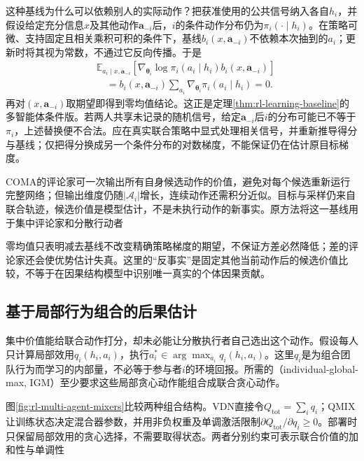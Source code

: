 这种基线为什么可以依赖别人的实际动作？把获准使用的公共信号纳入各自$h_i$，并假设给定充分信息$x$及其他动作$\bm a_{-i}$后，$i$的条件动作分布仍为$\pi_i(\cdot\mid h_i)$。在策略可微、支持固定且相关乘积可积的条件下，基线$b_i(x,\bm a_{-i})$不依赖本次抽到的$a_i$；更新时将其视为常数，不通过它反向传播。于是
\begin{align}
 &\mathbb E_{a_i\mid x,\bm a_{-i}}
   [\nabla_{\bm\theta_i}\log\pi_i(a_i\mid h_i)b_i(x,\bm a_{-i})]\nonumber\\
 &\quad=b_i(x,\bm a_{-i})
       \sum_{a_i}\nabla_{\bm\theta_i}\pi_i(a_i\mid h_i)=0.
 \label{eq:rl-multi-agent-baseline-zero}
\end{align}
再对$(x,\bm a_{-i})$取期望即得到零均值结论。这正是定理\ref{thm:rl-learning-baseline}的多智能体条件版。若两人共享未记录的随机信号，给定$\bm a_{-i}$后$i$的分布可能已不等于$\pi_i$，上述替换便不合法。应在真实联合策略中显式处理相关信号，并重新推导得分与基线；仅把得分换成另一个条件分布的对数梯度，不能保证仍在估计原目标梯度。

COMA的评论家可一次输出所有自身候选动作的价值，避免对每个候选重新运行完整网络；但输出维度仍随$|\mathcal A_i|$增长，连续动作还需积分近似。目标与采样仍来自联合轨迹，候选价值是模型估计，不是未执行动作的新事实。原方法将这一基线用于集中评论家和分散行动者

零均值只表明减去基线不改变精确策略梯度的期望，不保证方差必然降低；差的评论家还会使优势估计失真。这里的“反事实”是固定其他当前动作后的候选价值比较，不等于在因果结构模型中识别唯一真实的个体因果贡献。

\subsection{基于局部行为组合的后果估计}
\label{sec:rl-multi-agent-factorization}

集中价值能给联合动作打分，却未必能让分散执行者自己选出这个动作。假设每人只计算局部效用$q_i(h_i,a_i)$，执行$a_i^*\in\arg\max_{a_i}q_i(h_i,a_i)$。这里$q_i$是为组合团队行为而学习的内部量，不必等于参与者$i$的环境回报。所需的（individual-global-max, IGM）至少要求这些局部贪心动作能组合成联合贪心动作。

图\ref{fig:rl-multi-agent-mixers}比较两种组合结构。VDN直接令$Q_{\text{tot}}=\sum_i q_i$；QMIX让训练状态决定混合器参数，并用非负权重及单调激活限制$\partial Q_{\text{tot}}/\partial q_i\geq0$。部署时只保留局部效用的贪心选择，不需要取得状态。两者分别约束可表示联合价值的加和性与单调性

